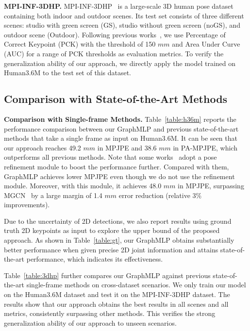 \documentclass[lettersize,journal]{IEEEtran}
\begin{document}
\noindent \textbf{MPI-INF-3DHP.}
MPI-INF-3DHP~\cite{mehta2017monocular} is a large-scale 3D human pose dataset containing both indoor and outdoor scenes. 
Its test set consists of three different scenes: studio with green screen (GS), studio without green screen (noGS), and outdoor scene (Outdoor).
Following previous works~\cite{ci2019optimizing,zeng2021learning,zou2021modulated}, we use Percentage of Correct Keypoint (PCK) with the threshold of 150 $mm$ and Area Under Curve (AUC) for a range of PCK thresholds as evaluation metrics. 
To verify the generalization ability of our approach, we directly apply the model trained on Human3.6M to the test set of this dataset. 

\subsection{Comparison with State-of-the-Art Methods}
\noindent \textbf{Comparison with Single-frame Methods.}
Table~\ref{table:h36m} reports the performance comparison between our GraphMLP and previous state-of-the-art methods that take a single frame as input on Human3.6M. 
It can be seen that our approach reaches 49.2 $mm$ in MPJPE and 38.6 $mm$ in PA-MPJPE, which outperforms all previous methods. 
Note that some works~\cite{stgcn,zou2021modulated} adopt a pose refinement module to boost the performance further. 
Compared with them, GraphMLP achieves lower MPJPE even though we do not use the refinement module. 
Moreover, with this module, it achieves 48.0 $mm$ in MPJPE, surpassing MGCN~\cite{zou2021modulated} by a large margin of 1.4 $mm$ error reduction (relative 3\% improvements). 

Due to the uncertainty of 2D detections, we also report results using ground truth 2D keypoints as input to explore the upper bound of the proposed approach. 
As shown in Table~\ref{table:gt}, our GraphMLP obtains substantially better performance when given precise 2D joint information and attains state-of-the-art performance, which indicates its effectiveness. 

Table~\ref{table:3dhp} further compares our GraphMLP against previous state-of-the-art single-frame methods on cross-dataset scenarios. 
We only train our model on the Human3.6M dataset and test it on the MPI-INF-3DHP dataset. 
The results show that our approach obtains the best results in all scenes and all metrics, consistently surpassing other methods. 
This verifies the strong generalization ability of our approach to unseen scenarios. 
\end{document}

